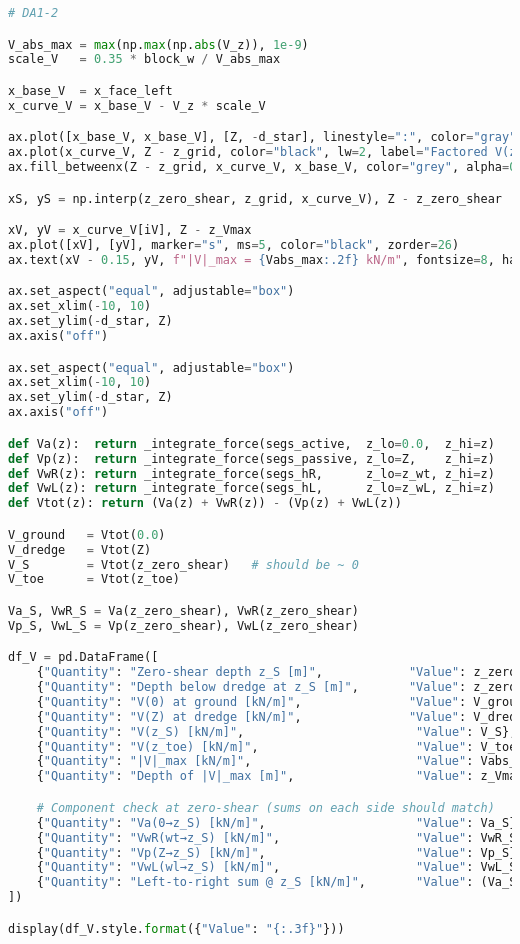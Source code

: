 \begin{lstlisting}[language=Python]
# DA1-2

V_abs_max = max(np.max(np.abs(V_z)), 1e-9)
scale_V   = 0.35 * block_w / V_abs_max

x_base_V  = x_face_left
x_curve_V = x_base_V - V_z * scale_V

ax.plot([x_base_V, x_base_V], [Z, -d_star], linestyle=":", color="gray", lw=1)
ax.plot(x_curve_V, Z - z_grid, color="black", lw=2, label="Factored V(z)")
ax.fill_betweenx(Z - z_grid, x_curve_V, x_base_V, color="grey", alpha=0.30)

xS, yS = np.interp(z_zero_shear, z_grid, x_curve_V), Z - z_zero_shear

xV, yV = x_curve_V[iV], Z - z_Vmax
ax.plot([xV], [yV], marker="s", ms=5, color="black", zorder=26)
ax.text(xV - 0.15, yV, f"|V|_max = {Vabs_max:.2f} kN/m", fontsize=8, ha="right", va="center")

ax.set_aspect("equal", adjustable="box")
ax.set_xlim(-10, 10)
ax.set_ylim(-d_star, Z)
ax.axis("off")

ax.set_aspect("equal", adjustable="box")
ax.set_xlim(-10, 10)
ax.set_ylim(-d_star, Z)
ax.axis("off")

def Va(z):  return _integrate_force(segs_active,  z_lo=0.0,  z_hi=z)
def Vp(z):  return _integrate_force(segs_passive, z_lo=Z,    z_hi=z)
def VwR(z): return _integrate_force(segs_hR,      z_lo=z_wt, z_hi=z)
def VwL(z): return _integrate_force(segs_hL,      z_lo=z_wL, z_hi=z)
def Vtot(z): return (Va(z) + VwR(z)) - (Vp(z) + VwL(z))

V_ground   = Vtot(0.0)
V_dredge   = Vtot(Z)
V_S        = Vtot(z_zero_shear)   # should be ~ 0
V_toe      = Vtot(z_toe)

Va_S, VwR_S = Va(z_zero_shear), VwR(z_zero_shear)
Vp_S, VwL_S = Vp(z_zero_shear), VwL(z_zero_shear)

df_V = pd.DataFrame([
    {"Quantity": "Zero-shear depth z_S [m]",            "Value": z_zero_shear},
    {"Quantity": "Depth below dredge at z_S [m]",       "Value": z_zero_shear - Z},
    {"Quantity": "V(0) at ground [kN/m]",               "Value": V_ground},
    {"Quantity": "V(Z) at dredge [kN/m]",               "Value": V_dredge},
    {"Quantity": "V(z_S) [kN/m]",                        "Value": V_S},
    {"Quantity": "V(z_toe) [kN/m]",                      "Value": V_toe},
    {"Quantity": "|V|_max [kN/m]",                       "Value": Vabs_max},
    {"Quantity": "Depth of |V|_max [m]",                 "Value": z_Vmax},

    # Component check at zero-shear (sums on each side should match)
    {"Quantity": "Va(0→z_S) [kN/m]",                     "Value": Va_S},
    {"Quantity": "VwR(wt→z_S) [kN/m]",                   "Value": VwR_S},
    {"Quantity": "Vp(Z→z_S) [kN/m]",                     "Value": Vp_S},
    {"Quantity": "VwL(wl→z_S) [kN/m]",                   "Value": VwL_S},
    {"Quantity": "Left-to-right sum @ z_S [kN/m]",       "Value": (Va_S + VwR_S) - (Vp_S + VwL_S)},  # ~ 0
])

display(df_V.style.format({"Value": "{:.3f}"}))
\end{lstlisting}

